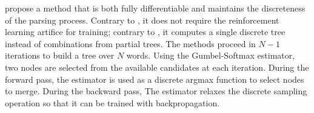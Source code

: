 
\textcite{choi_18} propose a method that is both fully differentiable and maintains the discreteness of the parsing process. Contrary to \textcite{yogatama_17}, it does not require the reinforcement learning artifice for training; contrary to \textcite{maillard_19}, it computes a single discrete tree instead of combinations from partial trees. The methods proceed in $N - 1$ iterations to build a tree over $N$ words. Using the Gumbel-Softmax estimator, two nodes are selected from the available candidates at each iteration. During the forward pass, the estimator is used as a discrete argmax function to select nodes to merge. During the backward pass, The estimator relaxes the discrete sampling operation so that it can be trained with backpropagation.









